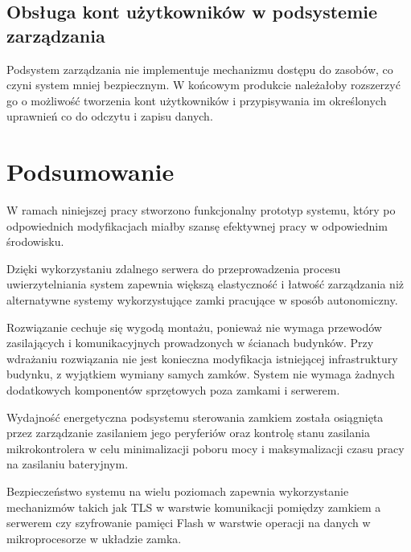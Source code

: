         \subsection{Obsługa kont użytkowników w podsystemie zarządzania}
            Podsystem zarządzania nie implementuje mechanizmu dostępu do zasobów, co czyni system mniej bezpiecznym. W końcowym produkcie należałoby rozszerzyć go o możliwość tworzenia kont użytkowników i przypisywania im określonych uprawnień co do odczytu i zapisu danych.

    \section{Podsumowanie}

        W ramach niniejszej pracy stworzono funkcjonalny prototyp systemu, który po odpowiednich modyfikacjach miałby szansę efektywnej pracy w odpowiednim środowisku.

        Dzięki wykorzystaniu zdalnego serwera do przeprowadzenia procesu uwierzytelniania system zapewnia większą elastyczność i łatwość zarządzania niż alternatywne systemy wykorzystujące zamki pracujące w sposób autonomiczny.

        Rozwiązanie cechuje się wygodą montażu, ponieważ nie wymaga przewodów zasilających i komunikacyjnych prowadzonych w ścianach budynków. Przy wdrażaniu rozwiązania nie jest konieczna modyfikacja istniejącej infrastruktury budynku, z wyjątkiem wymiany samych zamków. System nie wymaga żadnych dodatkowych komponentów sprzętowych poza zamkami i serwerem.

        Wydajność energetyczna podsystemu sterowania zamkiem została osiągnięta przez zarządzanie zasilaniem jego peryferiów oraz kontrolę stanu zasilania mikrokontrolera w celu minimalizacji poboru mocy i maksymalizacji czasu pracy na zasilaniu bateryjnym.

        Bezpieczeństwo systemu na wielu poziomach zapewnia wykorzystanie mechanizmów takich jak TLS w warstwie komunikacji pomiędzy zamkiem a serwerem czy szyfrowanie pamięci Flash w warstwie operacji na danych w mikroprocesorze w układzie zamka.